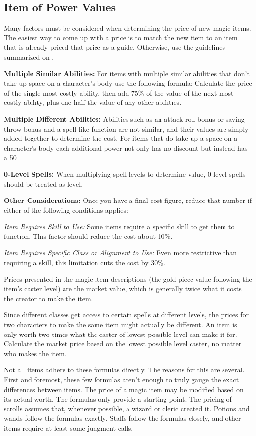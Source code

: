 \subsection{Item of Power Values}
Many factors must be considered when determining the price of new magic items. The easiest way to come up with a price is to match the new item to an item that is already priced that price as a guide. Otherwise, use the guidelines summarized on .

\textbf{Multiple Similar Abilities:} For items with multiple similar abilities that don't take up space on a character's body use the following formula: Calculate the price of the single most costly ability, then add 75\% of the value of the next most costly ability, plus one-half the value of any other abilities.

\textbf{Multiple Different Abilities:} Abilities such as an attack roll bonus or saving throw bonus and a spell-like function are not similar, and their values are simply added together to determine the cost. For items that do take up a space on a character's body each additional power not only has no discount but instead has a 50%

\textbf{0-Level Spells:} When multiplying spell levels to determine value, 0-level spells should be treated as \onehalf level.

\textbf{Other Considerations:} Once you have a final cost figure, reduce that number if either of the following conditions applies:

\textit{Item Requires Skill to Use:} Some items require a specific skill to get them to function. This factor should reduce the cost about 10\%.

\textit{Item Requires Specific Class or Alignment to Use:} Even more restrictive than requiring a skill, this limitation cuts the cost by 30\%.

Prices presented in the magic item descriptions (the gold piece value following the item's caster level) are the market value, which is generally twice what it costs the creator to make the item.

Since different classes get access to certain spells at different levels, the prices for two characters to make the same item might actually be different. An item is only worth two times what the caster of lowest possible level can make it for. Calculate the market price based on the lowest possible level caster, no matter who makes the item.

Not all items adhere to these formulas directly. The reasons for this are several. First and foremost, these few formulas aren't enough to truly gauge the exact differences between items. The price of a magic item may be modified based on its actual worth. The formulas only provide a starting point. The pricing of scrolls assumes that, whenever possible, a wizard or cleric created it. Potions and wands follow the formulas exactly. Staffs follow the formulas closely, and other items require at least some judgment calls.

